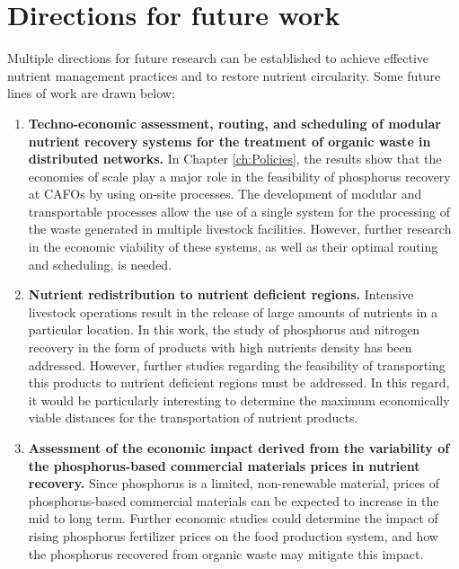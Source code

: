\section{Directions for future work}
Multiple directions for future research can be established to achieve effective nutrient management practices and to restore nutrient circularity. Some future lines of work are drawn below:

\begin{enumerate}[font=\bfseries]
	\item \textbf{Techno-economic assessment, routing, and scheduling of modular nutrient recovery systems for the treatment of organic waste in distributed networks.} In Chapter \ref{ch:Policies}, the results show that the economies of scale play a major role in the feasibility of phosphorus recovery at CAFOs by using on-site processes. The development of modular and transportable processes allow the use of a single system for the processing of the waste generated in multiple livestock facilities. However, further research in the economic viability of these systems, as well as their optimal routing and scheduling, is needed.
	
	\item \textbf{Nutrient redistribution to nutrient deficient regions.} Intensive livestock operations result in the release of large amounts of nutrients in a particular location. In this work, the study of phosphorus and nitrogen recovery in the form of products with high nutrients density has been addressed. However, further studies regarding the feasibility of transporting this products to nutrient deficient regions must be addressed. In this regard, it would be particularly interesting to determine the maximum economically viable distances for the transportation of nutrient products.
	
	\item \textbf{Assessment of the economic impact derived from the variability of the phosphorus-based commercial materials prices in nutrient recovery.} Since phosphorus is a limited, non-renewable material, prices of phosphorus-based commercial materials can be expected to increase in the mid to long term. Further economic studies could determine the impact of rising phosphorus fertilizer prices on the food production system, and how the phosphorus recovered from organic waste may mitigate this impact.
	

\end{enumerate}
